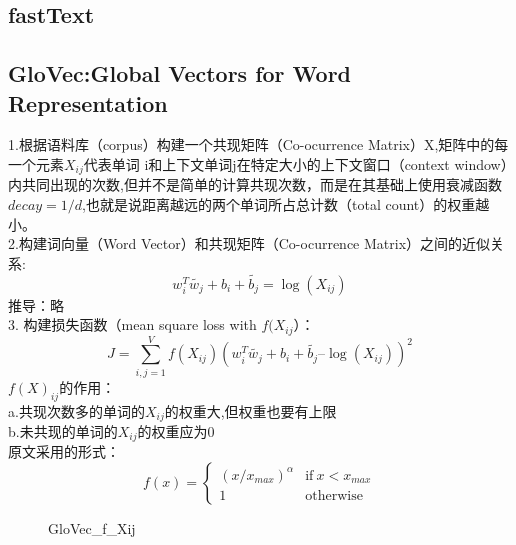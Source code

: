 \documentclass[UTF8]{article}%
\begin{document}
		\subsection{fastText}
		\subsection{GloVec:Global Vectors for Word Representation}
		1.根据语料库（corpus）构建一个共现矩阵（Co-ocurrence Matrix）X,矩阵中的每一个元素$X_{ij}$代表单词
		i和上下文单词j在特定大小的上下文窗口（context window）内共同出现的次数,但并不是简单的计算共现次数，而是在其基础上使用衰减函数$decay=1/d$,也就是说距离越远的两个单词所占总计数（total count）的权重越小。\\
		
		2.构建词向量（Word Vector）和共现矩阵（Co-ocurrence Matrix）之间的近似关系:
		$$w_{i}^{T}\tilde{w_{j}} + b_i + \tilde{b_j} = \log(X_{ij}) $$ \label{1-1}
		推导：略\\
		3. 构建损失函数（mean square loss with $f(X_{ij}$）：$$J = \sum_{i,j=1}^{V} f(X_{ij})(w_{i}^{T}\tilde{w_{j}} + b_i + \tilde{b_j} – \log(X_{ij}) )^2 $$ \label{1-2}
		$f(X)_{ij}$的作用：\\
		a.共现次数多的单词的$X_{ij}$的权重大,但权重也要有上限\\
		b.未共现的单词的$X_{ij}$的权重应为0\\
		原文采用的形式：
		\begin{equation} 
		f(x)=\begin{cases} 
		(x/x_{max})^{\alpha}  & \text{if} \ x < x_{max} \\ 
		1 & \text{otherwise} 
		\end{cases} 
		\end{equation} \label{1-3}
		\begin{figure}[h]%
			\centering  %
			\noindent{}%
			\caption{GloVec\_f\_Xij}  %
			\label{GloVec_f(Xij)}   %
		\end{figure}
	
\end{document}
